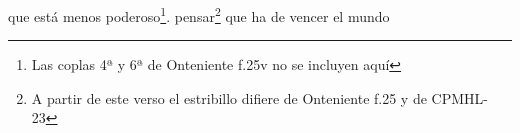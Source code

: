 que está menos poderoso\footnote{\textsuperscript{}Las coplas 4ª y 6ª de Onteniente f.25v no se incluyen aquí}.
pensar\footnote{\textsuperscript{}A partir de este verso el estribillo difiere de Onteniente f.25 y de CPMHL-23} que ha de vencer el mundo
